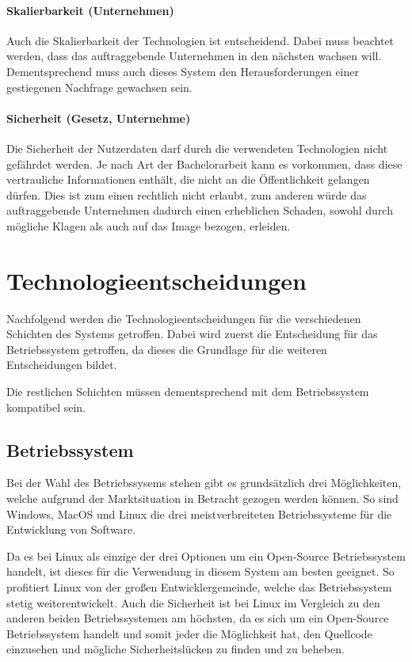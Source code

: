 \paragraph{Skalierbarkeit (Unternehmen)}\label{par:skalierbarkeit}
Auch die Skalierbarkeit der Technologien ist entscheidend.
Dabei muss beachtet werden, dass das auftraggebende
Unternehmen in den nächsten wachsen will.
Dementsprechend muss auch dieses System den
Herausforderungen einer gestiegenen Nachfrage gewachsen sein.

\paragraph{Sicherheit (Gesetz, Unternehme)}\label{par:sicherheit}
Die Sicherheit der Nutzerdaten darf durch die verwendeten Technologien nicht gefährdet werden.
Je nach Art der Bachelorarbeit kann es vorkommen, dass diese vertrauliche Informationen enthält,
die nicht an die Öffentlichkeit gelangen dürfen.
Dies ist zum einen rechtlich nicht erlaubt, zum anderen würde das auftraggebende Unternehmen
dadurch einen erheblichen Schaden, sowohl durch mögliche Klagen als auch auf das Image bezogen, erleiden.

\section{Technologieentscheidungen}\label{sec:technologieentscheidungen}
Nachfolgend werden die Technologieentscheidungen für die verschiedenen Schichten des Systems getroffen.
Dabei wird zuerst die Entscheidung für das Betriebssystem getroffen,
da dieses die Grundlage für die weiteren Entscheidungen bildet.

Die restlichen Schichten müssen dementsprechend mit dem Betriebssystem kompatibel sein.

\subsection{Betriebssystem}\label{subsec:betriebssystem}
Bei der Wahl des Betriebssysems stehen gibt es grundsätzlich drei Möglichkeiten,
welche aufgrund der Marktsituation in Betracht gezogen werden können.
So sind Windows, MacOS und Linux die drei meistverbreiteten Betriebssysteme für die Entwicklung von Software\autocite{JetBrains-2023}.

Da es bei Linux als einzige der drei Optionen um ein Open-Source Betriebssystem handelt,
ist dieses für die Verwendung in diesem System am besten geeignet.
So profitiert Linux von der großen Entwicklergemeinde, welche das Betriebssystem stetig weiterentwickelt.
Auch die Sicherheit ist bei Linux im Vergleich zu den anderen beiden Betriebssystemen am höchsten,
da es sich um ein Open-Source Betriebssystem handelt und somit jeder die Möglichkeit hat,
den Quellcode einzusehen und mögliche Sicherheitslücken zu finden und zu beheben.

